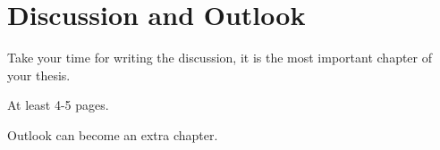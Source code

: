 
\chapter{Discussion and Outlook}
  \label{Discussion}

Take your time for writing the discussion, it is the most important chapter of your thesis.

At least 4-5 pages.

\bigskip
Outlook can become an extra chapter.
